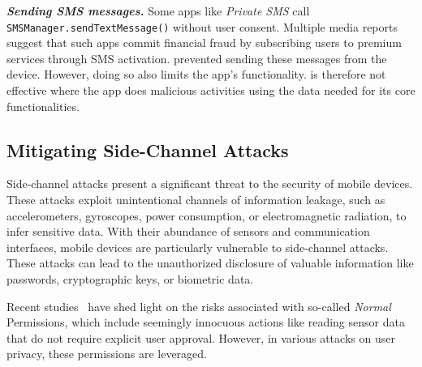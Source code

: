 

\noindent\textbf{\textit{Sending SMS messages.}} Some apps like \textit{Private
SMS} call \texttt{SMSManager.sendTextMessage()} without user consent.
Multiple media reports suggest that such apps commit financial fraud by
subscribing users to premium services through SMS activation. \framework
prevented sending these messages from the device. However, doing so also limits
the app's functionality. \framework is therefore not effective where the app
does malicious activities using the data needed for its core functionalities. 


\subsection{Mitigating Side-Channel Attacks}
\label{sec:side_channel_attack}
Side-channel attacks present a significant threat to the security of mobile devices. These attacks exploit unintentional channels of information leakage, such as accelerometers, gyroscopes, power consumption, or electromagnetic radiation, to infer sensitive data. With their abundance of sensors and communication interfaces, mobile devices are particularly vulnerable to side-channel attacks. These attacks can lead to the unauthorized disclosure of valuable information like passwords, cryptographic keys, or biometric data.

Recent studies~\cite{hasan2013sensing, simon2013pin, ba2020learning, shen2015input} have shed light on the risks associated with so-called \textit{Normal} Permissions, which include seemingly innocuous actions like reading sensor data that do not require explicit user approval. However, in various attacks on user privacy, these permissions are leveraged. 

